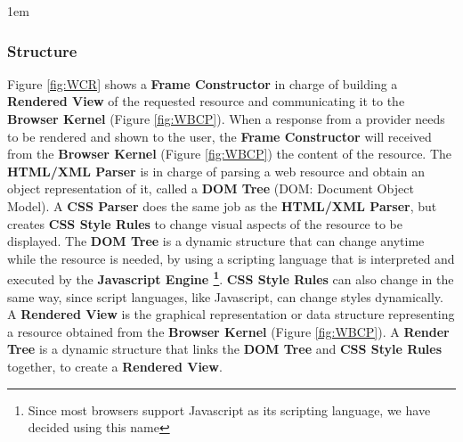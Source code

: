 \documentclass[prodmode,acmtecs]{acmsmall}
\begin{document}

    \leftskip1em

    \subsubsection*{Structure}
    Figure \ref{fig:WCR} shows a \textbf{Frame Constructor} in charge of building a \textbf{Rendered View} of the requested resource and communicating it to the \textbf{Browser Kernel} (Figure \ref{fig:WBCP}). When a response from a provider needs to be rendered and shown to the user, the \textbf{Frame Constructor} will received from the \textbf{Browser Kernel} (Figure \ref{fig:WBCP}) the content of the resource. The \textbf{HTML/XML Parser} is in charge of parsing a web resource and obtain an object representation of it, called a \textbf{DOM Tree} (DOM: Document Object Model). A \textbf{CSS Parser} does the same job as the \textbf{HTML/XML Parser}, but creates \textbf{CSS Style Rules} to change visual aspects of the resource to be displayed. The \textbf{DOM Tree} is a dynamic structure that can change anytime while the resource is needed, by using a scripting language that is interpreted and executed by the \textbf{Javascript Engine \footnote{Since most browsers support Javascript as its scripting language, we have decided using this name}}. \textbf{CSS Style Rules} can also change in the same way, since script languages, like Javascript, can change styles dynamically. A \textbf{Rendered View} is the graphical representation or data structure representing a resource obtained from the \textbf{Browser Kernel} (Figure \ref{fig:WBCP}). A \textbf{Render Tree} is a dynamic structure that links the \textbf{DOM Tree} and \textbf{CSS Style Rules} together, to create a \textbf{Rendered View}.
\end{document}
